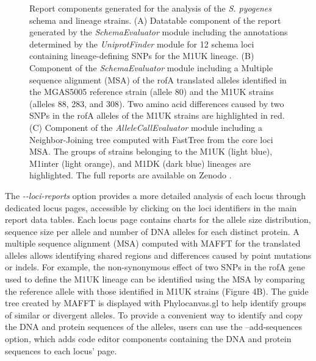 \begin{figure}[h!]
    \caption{Report components generated for the analysis of the \textit{S. pyogenes} schema and lineage strains. (A) Datatable component of the report generated by the \textit{SchemaEvaluator} module including the annotations determined by the \textit{UniprotFinder} module for 12 schema loci containing lineage-defining SNPs for the M1UK lineage. (B) Component of the \textit{SchemaEvaluator} module including a Multiple sequence alignment (MSA) of the rofA translated alleles identified in the MGAS5005 reference strain (allele 80) and the M1UK strains (alleles 88, 283, and 308). Two amino acid differences caused by two SNPs in the rofA alleles of the M1UK strains are highlighted in red. (C) Component of the \textit{AlleleCallEvaluator} module including a Neighbor-Joining tree computed with FastTree from the core loci MSA. The groups of strains belonging to the M1UK (light blue), M1inter (light orange), and M1DK (dark blue) lineages are highlighted. The full reports are available on Zenodo \citep{mamede_supplementary_2025}.}
\end{figure}

The \textit{-{}-loci-reports} option provides a more detailed analysis of each locus through dedicated locus pages, accessible by clicking on the loci identifiers in the main report data tables. Each locus page contains charts for the allele size distribution, sequence size per allele and number of DNA alleles for each distinct protein. A multiple sequence alignment (MSA) computed with MAFFT \citep{katoh_mafft_2013} for the translated alleles allows identifying shared regions and differences caused by point mutations or indels. For example, the non-synonymous effect of two SNPs in the rofA gene used to define the M1UK lineage can be identified using the MSA by comparing the reference allele with those identified in M1UK strains (Figure 4B). The guide tree created by MAFFT is displayed with Phylocanvas.gl \citep{abudahab_phylocanvasgl_2021} to help identify groups of similar or divergent alleles. To provide a convenient way to identify and copy the DNA and protein sequences of the alleles, users can use the --add-sequences option, which adds code editor components containing the DNA and protein sequences to each locus’ page.

